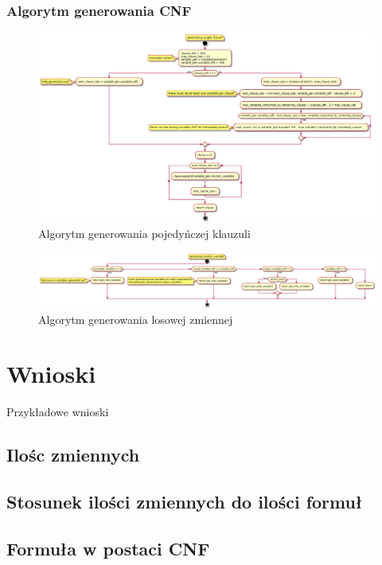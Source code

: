\documentclass[a4paper,12pt]{article}
\begin{document}
\subsubsection{Algorytm generowania CNF}

\begin{figure}[H]
  \centering
  \includegraphics[width=\textwidth]{lfg/clause_generator.png}
  \caption{Algorytm generowania pojedyńczej klauzuli}
\end{figure}

\begin{figure}[H]
  \centering
  \includegraphics[width=\textwidth]{lfg/variable_generator.png}
  \caption{Algorytm generowania losowej zmiennej}
\end{figure}

\section{Wnioski}

Przykładowe wnioski

\subsection{Ilośc zmiennych}

\subsection{Stosunek ilości zmiennych do ilości formuł}

\subsection{Formuła w postaci CNF}

\printglossary
\end{document}
